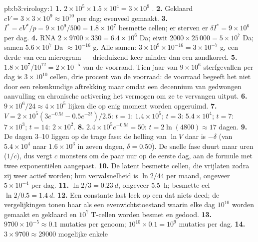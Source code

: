 \begin{solution}{pb:b3:virology:1}
\textbf{1.} $2\times 10^{5}\times 1.5\times 10^{4} = 3\times 10^{9}$
.
\textbf{2.} Geklaard $cV = 3\times 3\times 10^{9} \approx 10^{10}$ per
dag; evenveel gemaakt.
\textbf{3.} $I^{*} = cV^{*}/p = 9\times 10^{9}/500 = 1.8\times 10^{7}$
besmette cellen; er sterven er $\delta I^{*} = 9\times 10^{6}$ per dag.
\textbf{4.} RNA $2\times 9700\times 330 = 6.4\times 10^{6}$ Da; eiwit
$2000\times 25\,000 = 5\times 10^{7}$ Da; samen $5.6\times 10^{7}$ Da
$\approx 10^{-16}$ g. Alle  samen: $3\times 10^{9}\times
10^{-16} = 3\times 10^{-7}$ g, een derde van een microgram ---
drieduizend keer minder dan een zandkorrel.
\textbf{5.} $1.8\times 10^{7}/10^{12} = 2\times 10^{-5}$ van de
voorraad. Tien jaar van $9\times 10^{6}$ sterfgevallen per dag is
$3\times 10^{10}$ cellen, drie procent van de voorraad: de voorraad
begeeft het niet door een rekenkundige aftrekking maar omdat een
decennium van gedwongen aanvulling en chronische activering het vermogen
om ze te vervangen uitput.
\textbf{6.} $9\times 10^{6}/24 \approx 4\times 10^{5}$ lijken die op
enig moment worden opgeruimd.
\textbf{7.} $V = 2\times 10^{5}(3e^{-0.5t} - 0.5e^{-3t})/2.5$: $t = 1$:
$1.4\times 10^{5}$; $t = 3$: $5.4\times 10^{4}$; $t = 7$: $7\times
10^{3}$; $t = 14$: $2\times 10^{2}$.
\textbf{8.} $2.4\times 10^{5}e^{-0.5t} = 50$: $t = 2\ln(4800) \approx 17$
dagen.
\textbf{9.} De dagen 3--10 liggen op de trage fase: de helling van
$\ln V$ daar is $-\delta$ (van $5.4\times 10^{4}$ naar $1.6\times 10^{3}$
in zeven dagen, $\delta = 0.50$). De snelle fase duurt maar uren
($1/c$), dus vergt $c$ monsters om de paar uur op de eerste dag, aan de
formule met twee exponentiëlen aangepast.
\textbf{10.} De latent besmette cellen, die  vrijlaten zodra zij
weer actief worden; hun vervalsnelheid is $\ln 2/44$ per maand, ongeveer
$5\times 10^{-4}$ per dag.
\textbf{11.}  $\ln 2/3 = \qty{0.23}{d}$, ongeveer \qty{5.5}{h};
besmette cel $\ln 2/0.5 = \qty{1.4}{d}$.
\textbf{12.} Een constante last leek op een  dat niets deed; de
vergelijkingen tonen haar als een evenwichtstoestand waarin elke dag
$10^{10}$  worden gemaakt en geklaard en $10^{7}$ T-cellen
worden besmet en gedood.
\textbf{13.} $9700\times 10^{-5} \approx 0.1$ mutaties per genoom;
$10^{10}\times 0.1 = 10^{9}$ mutaties per dag.
\textbf{14.} $3\times 9700 \approx \num{29000}$ mogelijke enkele

\end{solution}

